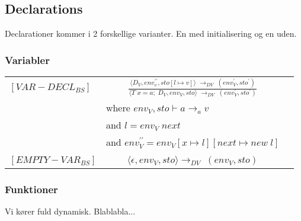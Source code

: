 \noindent \subsection{Declarations}
Declarationer kommer i 2 forskellige varianter. En med initialisering og en uden.


\subsubsection*{Variabler}

\begin{semantik}
    \bgroup
    \def\arraystretch{1.5}
    \begin{table}[H]
    \centering
    \begin{tabular}{l c l}
        
        $[VAR-DECL_{BS}]$ & $
        \frac{\langle D_V, env_v^{\prime\prime}, sto[l \mapsto v] \rangle\;\rightarrow_{DV}\; (env_V^\prime, sto^\prime)}
        {\langle T\; x = a;\; D_V, env_V, sto \rangle\; \rightarrow_{DV}\; (env_V^\prime, sto^\prime)}
        $ & \\
        
        & \multicolumn{1}{l}{where $ env_V, sto \vdash a \rightarrow_a v $}\\
        & \multicolumn{1}{l}{and $ l = env_V\; next $}\\
        & \multicolumn{1}{l}{and $ env_V^{\prime\prime} = env_V[x \mapsto l] [next \mapsto new\;l] $}\\
        
        &&\\
        
        $[EMPTY-VAR_{BS}]$ & $
        \langle \epsilon, env_V, sto \rangle \rightarrow_{DV}\; (env_V, sto) 
        $
        
    \end{tabular}
    \end{table}
    \egroup
    \caption{Deklaration af variabler}
    \label{sem:variabler}
\end{semantik}



\subsubsection*{Funktioner}

Vi kører fuld dynamisk. Blablabla...


